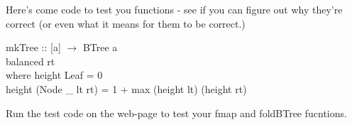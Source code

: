 \documentclass[11pt]{article}
\begin{document}
Here's come code to test you functions - see if you can figure out why they're
correct (or even what it means for them to be correct.)
\begin{smallprogram*}
\> mkTree :: [a] $\rightarrow$ BTree a   \\
 balanced rt \\
\>   where height Leaf = 0\\
\>         height (Node \_ lt rt) = 1 + max (height lt) (height rt)
\end{smallprogram*}

\begin{exercise}
Run the test code on the web-page to test your fmap and foldBTree fucntions.
\end{exercise}
\end{document}
